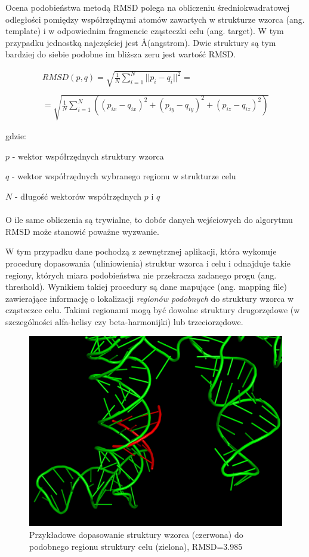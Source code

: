 \documentclass[licencjacka]{pracamgr}
\begin{document}
Ocena podobieństwa metodą RMSD polega na obliczeniu średniokwadratowej odległości pomiędzy współrzędnymi atomów zawartych w strukturze wzorca (ang. template) i w odpowiednim fragmencie cząsteczki celu (ang. target). W tym przypadku jednostką najczęściej jest \AA (angstrom). Dwie struktury są tym bardziej do siebie podobne im bliższa zeru jest wartość RMSD.

$$
\begin{array}{lr}
RMSD(p,q) = \sqrt{\frac{1}{N}\sum_{i=1}^{N}||p_i-q_i||^{2}} = \\
\\
= \sqrt{\frac{1}{N}\sum_{i=1}^{N}((p_{ix}-q_{ix})^{2}+(p_{iy}-q_{iy})^{2}+(p_{iz}-q_{iz})^{2})}
\end{array}
$$

gdzie:

$p$ - wektor współrzędnych struktury wzorca

$q$ - wektor współrzędnych wybranego regionu w strukturze celu

$N$ - długość wektorów współrzędnych $p$ i $q$
\\
\\
O ile same obliczenia są trywialne, to dobór danych wejściowych do algorytmu RMSD może stanowić poważne wyzwanie. 

W tym przypadku dane pochodzą z zewnętrznej aplikacji, która wykonuje procedurę dopasowania (uliniowienia) struktur wzorca i celu i odnajduje takie regiony, których miara podobieństwa nie przekracza zadanego progu (ang. threshold). Wynikiem takiej procedury są dane mapujące (ang. mapping file) zawierające informację o lokalizacji \textit{regionów podobnych} do struktury wzorca w cząsteczce celu. Takimi regionami mogą być dowolne struktury drugorzędowe (w szczególności alfa-helisy czy beta-harmonijki) lub trzeciorzędowe.

\begin{figure}[H]
\centering
\includegraphics[scale=0.2]{rmsd3}
\caption{Przykładowe dopasowanie struktury wzorca (czerwona) do podobnego regionu struktury celu (zielona), RMSD=3.985}
\end{figure}
\end{document}
